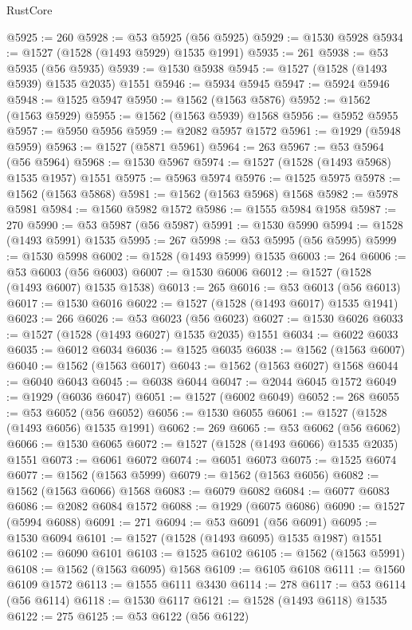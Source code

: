 \begin{lexlean}{RustCore}
\begin{coremodule}
@5925 := 260
@5928 := @53 @5925 (@56 @5925)
@5929 := @1530 @5928
@5934 := @1527 (@1528 (@1493 @5929) @1535 @1991)
@5935 := 261
@5938 := @53 @5935 (@56 @5935)
@5939 := @1530 @5938
@5945 := @1527 (@1528 (@1493 @5939) @1535 @2035) @1551
@5946 := @5934 @5945
@5947 := @5924 @5946
@5948 := @1525 @5947
@5950 := @1562 (@1563 @5876)
@5952 := @1562 (@1563 @5929)
@5955 := @1562 (@1563 @5939) @1568
@5956 := @5952 @5955
@5957 := @5950 @5956
@5959 := @2082 @5957 @1572
@5961 := @1929 (@5948 @5959)
@5963 := @1527 (@5871 @5961)
@5964 := 263
@5967 := @53 @5964 (@56 @5964)
@5968 := @1530 @5967
@5974 := @1527 (@1528 (@1493 @5968) @1535 @1957) @1551
@5975 := @5963 @5974
@5976 := @1525 @5975
@5978 := @1562 (@1563 @5868)
@5981 := @1562 (@1563 @5968) @1568
@5982 := @5978 @5981
@5984 := @1560 @5982 @1572
@5986 := @1555 @5984 @1958
@5987 := 270
@5990 := @53 @5987 (@56 @5987)
@5991 := @1530 @5990
@5994 := @1528 (@1493 @5991) @1535
@5995 := 267
@5998 := @53 @5995 (@56 @5995)
@5999 := @1530 @5998
@6002 := @1528 (@1493 @5999) @1535
@6003 := 264
@6006 := @53 @6003 (@56 @6003)
@6007 := @1530 @6006
@6012 := @1527 (@1528 (@1493 @6007) @1535 @1538)
@6013 := 265
@6016 := @53 @6013 (@56 @6013)
@6017 := @1530 @6016
@6022 := @1527 (@1528 (@1493 @6017) @1535 @1941)
@6023 := 266
@6026 := @53 @6023 (@56 @6023)
@6027 := @1530 @6026
@6033 := @1527 (@1528 (@1493 @6027) @1535 @2035) @1551
@6034 := @6022 @6033
@6035 := @6012 @6034
@6036 := @1525 @6035
@6038 := @1562 (@1563 @6007)
@6040 := @1562 (@1563 @6017)
@6043 := @1562 (@1563 @6027) @1568
@6044 := @6040 @6043
@6045 := @6038 @6044
@6047 := @2044 @6045 @1572
@6049 := @1929 (@6036 @6047)
@6051 := @1527 (@6002 @6049)
@6052 := 268
@6055 := @53 @6052 (@56 @6052)
@6056 := @1530 @6055
@6061 := @1527 (@1528 (@1493 @6056) @1535 @1991)
@6062 := 269
@6065 := @53 @6062 (@56 @6062)
@6066 := @1530 @6065
@6072 := @1527 (@1528 (@1493 @6066) @1535 @2035) @1551
@6073 := @6061 @6072
@6074 := @6051 @6073
@6075 := @1525 @6074
@6077 := @1562 (@1563 @5999)
@6079 := @1562 (@1563 @6056)
@6082 := @1562 (@1563 @6066) @1568
@6083 := @6079 @6082
@6084 := @6077 @6083
@6086 := @2082 @6084 @1572
@6088 := @1929 (@6075 @6086)
@6090 := @1527 (@5994 @6088)
@6091 := 271
@6094 := @53 @6091 (@56 @6091)
@6095 := @1530 @6094
@6101 := @1527 (@1528 (@1493 @6095) @1535 @1987) @1551
@6102 := @6090 @6101
@6103 := @1525 @6102
@6105 := @1562 (@1563 @5991)
@6108 := @1562 (@1563 @6095) @1568
@6109 := @6105 @6108
@6111 := @1560 @6109 @1572
@6113 := @1555 @6111 @3430
@6114 := 278
@6117 := @53 @6114 (@56 @6114)
@6118 := @1530 @6117
@6121 := @1528 (@1493 @6118) @1535
@6122 := 275
@6125 := @53 @6122 (@56 @6122)

\end{coremodule}
\end{lexlean}
